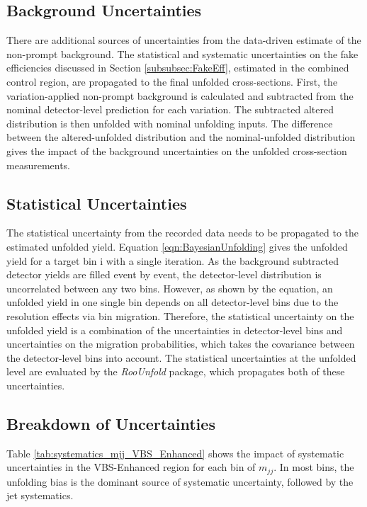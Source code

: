\subsection{Background Uncertainties}
\label{subsec:BkgUnc}
There are additional sources of uncertainties from the data-driven estimate of the non-prompt background. The statistical and systematic uncertainties on the fake efficiencies discussed in Section \ref{subsubsec:FakeEff}, estimated in the combined control region, are propagated to the final unfolded cross-sections. First, the variation-applied non-prompt background is calculated and subtracted from the nominal detector-level prediction for each variation. The subtracted altered distribution is then unfolded with nominal unfolding inputs. The difference between the altered-unfolded distribution and the nominal-unfolded distribution gives the impact of the background uncertainties on the unfolded cross-section measurements.

\subsection{Statistical Uncertainties}
\label{subsubsec:StatUnc}
The statistical uncertainty from the recorded data needs to be propagated to the estimated unfolded yield. Equation \ref{eqn:BayesianUnfolding} gives the unfolded yield for a target bin i with a single iteration. As the background subtracted detector yields are filled event by event, the detector-level distribution is uncorrelated between any two bins. However, as shown by the equation, an unfolded yield in one single bin depends on all detector-level bins due to the resolution effects via bin migration. Therefore, the statistical uncertainty on the unfolded yield is a combination of the uncertainties in detector-level bins and uncertainties on the migration probabilities, which takes the covariance between the detector-level bins into account. The statistical uncertainties at the unfolded level are evaluated by the \textit{RooUnfold} package, which propagates both of these uncertainties.

\subsection{Breakdown of Uncertainties }
\label{subsec:SysUncBreakdown}
Table \ref{tab:systematics_mjj_VBS_Enhanced} shows the impact of systematic uncertainties in the VBS-Enhanced region for each bin of $m_{jj}$. In most bins, the unfolding bias is the dominant source of systematic uncertainty, followed by the jet systematics. 

